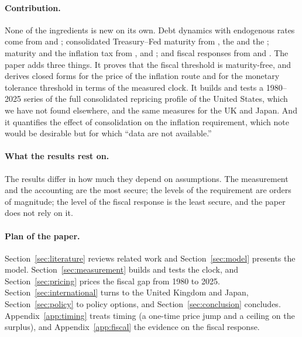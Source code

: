 \paragraph{Contribution.} None of the ingredients is new on its own. Debt dynamics with endogenous rates come from \citet{mian2025} and \citet{lorenzoni2019}; consolidated Treasury--Fed maturity from \citet{greenwood2014}, the \citet{tbac2020,tbac2026} and the \citet{obr2021}; maturity and the inflation tax from \citet{cochrane2001,cochrane2022}, \citet{hilscher2022} and \citet{barro2026}; and fiscal responses from \citet{bohn1998} and \citet{auerbach2024}. The paper adds three things. It proves that the fiscal threshold is maturity-free, and derives closed forms for the price of the inflation route and for the monetary tolerance threshold in terms of the measured clock. It builds and tests a 1980--2025 series of the full consolidated repricing profile of the United States, which we have not found elsewhere, and the same measures for the UK and Japan. And it quantifies the effect of consolidation on the inflation requirement, which \citet{barro2026} note would be desirable but for which ``data are not available.''

\paragraph{What the results rest on.} The results differ in how much they depend on assumptions. The measurement and the accounting are the most secure; the levels of the requirement are orders of magnitude; the level of the fiscal response is the least secure, and the paper does not rely on it.



\paragraph{Plan of the paper.} Section~\ref{sec:literature} reviews related work and Section~\ref{sec:model} presents the model. Section~\ref{sec:measurement} builds and tests the clock, and Section~\ref{sec:pricing} prices the fiscal gap from 1980 to 2025. Section~\ref{sec:international} turns to the United Kingdom and Japan, Section~\ref{sec:policy} to policy options, and Section~\ref{sec:conclusion} concludes. Appendix~\ref{app:timing} treats timing (a one-time price jump and a ceiling on the surplus), and Appendix~\ref{app:fiscal} the evidence on the fiscal response.
